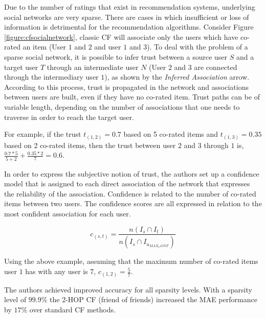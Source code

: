 Due to the number of ratings that exist in recommendation systems, underlying
social networks are very sparse. There are cases in which insufficient or loss
of information is detrimental for the recommendation algorithms. Consider
Figure \ref{figure:cfsocialnetwork}, classic CF will associate only the users
which have co-rated an item (User $1$ and $2$ and user $1$ and $3$). To deal
with the problem of a sparse social network, it is possible to infer trust
between a source user $S$ and a target user $T$ through an intermediate user
$N$ (User $2$ and $3$ are connected through the intermediary user $1$), as
shown by the \emph{Inferred Association} arrow. According to this process,
trust is propagated in the network and associations between users are built,
even if they have no co-rated item. Trust paths can be of variable length,
depending on the number of associations that one needs to traverse in order to
reach the target user.

For example, if the trust $t_{(1,2)} = 0.7$ based on 5 co-rated items
and $t_{(1,3)} = 0.35$ based on 2 co-rated items, then the trust
between user $2$ and $3$ through $1$ is, $\frac{0.7*5}{5+2} + \frac{0.35*2}{7} = 0.6$.

In order to express the subjective notion of trust, the authors set up a
confidence model that is assigned to each direct association of the network
that expresses the reliability of the association. Confidence is related to the
number of co-rated items between two users. The confidence scores are all
expressed in relation to the most confident association for each user.

\begin{equation}
c_{(s,t)} = \frac{n(I_{s} \cap I_{t})}{n(I_{s} \cap I_{u_{MAX_CONF}})}
\end{equation}

Using the above example, assuming that the maximum number of co-rated items
user $1$ has with any user is 7, $c_{(1,2)} = \frac{5}{7}$.

The authors achieved improved accuracy for all sparsity levels. With a sparsity
level of $99.9\%$ the 2-HOP CF (friend of friends) increased the MAE
performance by $17\%$ over standard CF methods.



